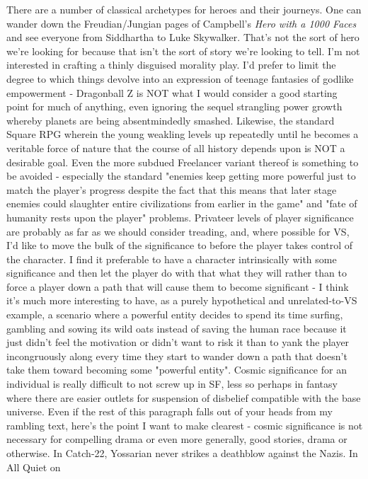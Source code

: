 There are a number of classical archetypes for heroes and their
journeys. One can wander down the Freudian/Jungian pages of Campbell's
{\em Hero with a 1000 Faces} and see everyone from Siddhartha to Luke
Skywalker.  That's not the sort of hero we're looking for because that
isn't the sort of story we're looking to tell. I'm not interested in
crafting a thinly disguised morality play. I'd prefer to limit the
degree to which things devolve into an expression of teenage fantasies
of godlike empowerment - Dragonball Z is NOT what I would consider a
good starting point for much of anything, even ignoring the sequel
strangling power growth whereby planets are being absentmindedly
smashed. Likewise, the standard Square RPG wherein the young weakling
levels up repeatedly until he becomes a veritable force of nature that
the course of all history depends upon is NOT a desirable goal. Even
the more subdued Freelancer variant thereof is something to be avoided
- especially the standard "enemies keep getting more powerful just to
match the player's progress despite the fact that this means that
later stage enemies could slaughter entire civilizations from earlier
in the game" and "fate of humanity rests upon the player"
problems. Privateer levels of player significance are probably as far
as we should consider treading, and, where possible for VS, I'd like
to move the bulk of the significance to before the player takes
control of the character. I find it preferable to have a character
intrinsically with some significance and then let the player do with
that what they will rather than to force a player down a path that
will cause them to become significant - I think it's much more
interesting to have, as a purely hypothetical and unrelated-to-VS
example, a scenario where a powerful entity decides to spend its time
surfing, gambling and sowing its wild oats instead of saving the human
race because it just didn't feel the motivation or didn't want to risk
it than to yank the player incongruously along every time they start
to wander down a path that doesn't take them toward becoming some
"powerful entity". Cosmic significance for an individual is really
difficult to not screw up in SF, less so perhaps in fantasy where
there are easier outlets for suspension of disbelief compatible with
the base universe. Even if the rest of this paragraph falls out of
your heads from my rambling text, here's the point I want to make
clearest - cosmic significance is not necessary for compelling drama
or even more generally, good stories, drama or otherwise. In Catch-22,
Yossarian never strikes a deathblow against the Nazis. In All Quiet on
